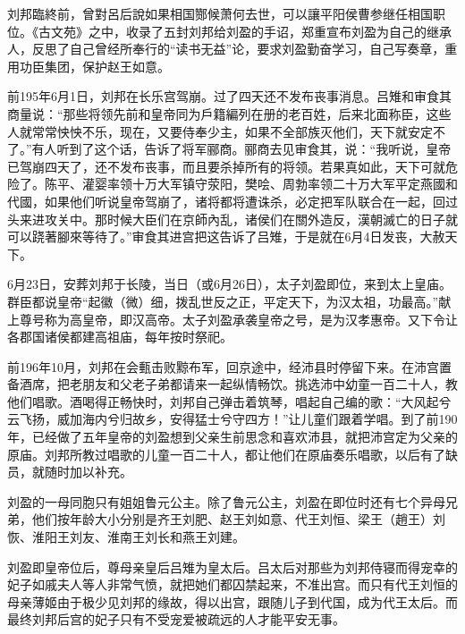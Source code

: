 刘邦臨終前，曾對呂后說如果相国酂候萧何去世，可以讓平阳侯曹参继任相国职位。《古文苑》之中，收录了五封刘邦给刘盈的手诏，郑重宣布刘盈为自己的继承人，反思了自己曾经所奉行的“读书无益”论，要求刘盈勤奋学习，自己写奏章，重用功臣集团，保护赵王如意。

前195年6月1日，刘邦在长乐宫驾崩。过了四天还不发布丧事消息。吕雉和审食其商量说：“那些将领先前和皇帝同为戶籍編列在册的老百姓，后来北面称臣，这些人就常常怏怏不乐，现在，又要侍奉少主，如果不全部族灭他们，天下就安定不了。”有人听到了这个话，告诉了将军郦商。郦商去见审食其，说：“我听说，皇帝已驾崩四天了，还不发布丧事，而且要杀掉所有的将领。若果真如此，天下可就危险了。陈平、灌婴率领十万大军镇守荥阳，樊哙、周勃率领二十万大军平定燕國和代國，如果他们听说皇帝驾崩了，诸将都将遭诛杀，必定把军队联合在一起，回过头来进攻关中。那时候大臣们在京師內乱，诸侯们在關外造反，漢朝滅亡的日子就可以跷著腳來等待了。”审食其进宫把这告诉了吕雉，于是就在6月4日发丧，大赦天下。

6月23日，安葬刘邦于长陵，当日（或6月26日），太子刘盈即位，来到太上皇庙。群臣都说皇帝“起徽（微）细，拨乱世反之正，平定天下，为汉太祖，功最高。”献上尊号称为高皇帝，即汉高帝。太子刘盈承袭皇帝之号，是为汉孝惠帝。又下令让各郡国诸侯都建高祖庙，每年按时祭祀。

前196年10月，刘邦在会甀击败黥布军，回京途中，经沛县时停留下来。在沛宫置备酒席，把老朋友和父老子弟都请来一起纵情畅饮。挑选沛中幼童一百二十人，教他们唱歌。酒喝得正畅快时，刘邦自己弹击着筑琴，唱起自己编的歌：“大风起兮云飞扬，威加海内兮归故乡，安得猛士兮守四方！”让儿童们跟着学唱。到了前190年，已经做了五年皇帝的刘盈想到父亲生前思念和喜欢沛县，就把沛宫定为父亲的原庙。刘邦所教过唱歌的儿童一百二十人，都让他们在原庙奏乐唱歌，以后有了缺员，就随时加以补充。

刘盈的一母同胞只有姐姐鲁元公主。除了鲁元公主，刘盈在即位时还有七个异母兄弟，他们按年龄大小分别是齐王刘肥、赵王刘如意、代王刘恒、梁王（趙王）刘恢、淮阳王刘友、淮南王刘长和燕王刘建。

刘盈即皇帝位后，尊母亲皇后吕雉为皇太后。吕太后对那些为刘邦侍寝而得宠幸的妃子如戚夫人等人非常气愤，就把她们都囚禁起来，不准出宫。而只有代王刘恒的母亲薄姬由于极少见刘邦的缘故，得以出宫，跟随儿子到代国，成为代王太后。而最终刘邦后宫的妃子只有不受宠爱被疏远的人才能平安无事。

